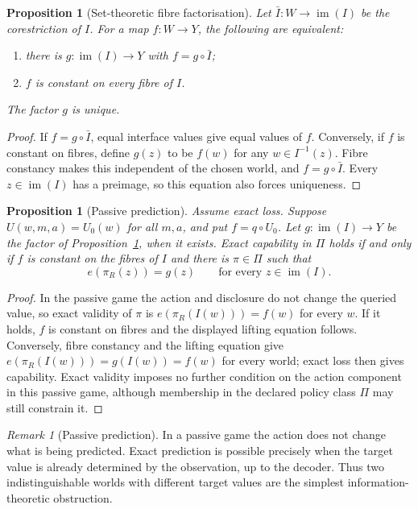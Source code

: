 \documentclass[11pt]{article}
\theoremstyle{plain}
\newtheorem{proposition}[theorem]{Proposition}
\theoremstyle{definition}
\theoremstyle{remark}
\newtheorem{remark}[theorem]{Remark}
\newcommand{\im}{\operatorname{im}}
\begin{document}
\begin{proposition}[Set-theoretic fibre factorisation]\label{prop:fibrefactor}
Let $\bar I:W\to\im(I)$ be the corestriction of $I$. For a map $f:W\to Y$,
the following are equivalent:
\begin{enumerate}[label=(\roman*)]
\item there is $g:\im(I)\to Y$ with $f=g\circ\bar I$;
\item $f$ is constant on every fibre of $I$.
\end{enumerate}
The factor $g$ is unique.
\end{proposition}

\begin{proof}
If $f=g\circ\bar I$, equal interface values give equal values of $f$. Conversely,
if $f$ is constant on fibres, define $g(z)$ to be $f(w)$ for any
$w\in I^{-1}(z)$. Fibre constancy makes this independent of the chosen world,
and $f=g\circ\bar I$. Every $z\in\im(I)$ has a preimage, so this equation also
forces uniqueness.
\end{proof}

\begin{proposition}[Passive prediction]\label{prop:passive}
Assume exact loss. Suppose $U(w,m,a)=U_0(w)$ for all $m,a$, and put $f=q\circ U_0$. Let
$g:\im(I)\to Y$ be the factor of Proposition~\ref{prop:fibrefactor}, when it
exists. Exact capability in $\Pi$ holds if and only if $f$ is constant on the
fibres of $I$ and there is $\pi\in\Pi$ such that
\[
e(\pi_R(z))=g(z)\qquad\text{for every }z\in\im(I).
\]
\end{proposition}

\begin{proof}
In the passive game the action and disclosure do not change the queried value,
so exact validity of $\pi$ is
$e(\pi_R(I(w)))=f(w)$ for every $w$. If it holds, $f$ is constant on fibres and
the displayed lifting equation follows. Conversely, fibre constancy and the
lifting equation give $e(\pi_R(I(w)))=g(I(w))=f(w)$ for every world; exact loss
then gives capability. Exact validity imposes no further condition on the action
component in this passive game, although membership in the declared policy class
$\Pi$ may still constrain it.
\end{proof}

\begin{remark}[Passive prediction]
In a passive game the action does not change what is being predicted. Exact
prediction is possible precisely when the target value is already determined by
the observation, up to the decoder. Thus two indistinguishable worlds with
different target values are the simplest information-theoretic obstruction.
\end{remark}
\end{document}
